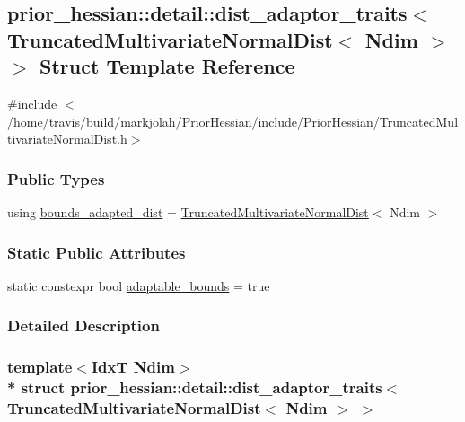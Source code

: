 \hypertarget{structprior__hessian_1_1detail_1_1dist__adaptor__traits_3_01TruncatedMultivariateNormalDist_3_01Ndim_01_4_01_4}{}\subsection{prior\+\_\+hessian\+:\+:detail\+:\+:dist\+\_\+adaptor\+\_\+traits$<$ Truncated\+Multivariate\+Normal\+Dist$<$ Ndim $>$ $>$ Struct Template Reference}
\label{structprior__hessian_1_1detail_1_1dist__adaptor__traits_3_01TruncatedMultivariateNormalDist_3_01Ndim_01_4_01_4}


{\ttfamily \#include $<$/home/travis/build/markjolah/\+Prior\+Hessian/include/\+Prior\+Hessian/\+Truncated\+Multivariate\+Normal\+Dist.\+h$>$}

\subsubsection*{Public Types}
\begin{DoxyCompactItemize}
\item 
using \hyperlink{structprior__hessian_1_1detail_1_1dist__adaptor__traits_3_01TruncatedMultivariateNormalDist_3_01Ndim_01_4_01_4_a43e134989627146928378cf267b991b4}{bounds\+\_\+adapted\+\_\+dist} = \hyperlink{namespaceprior__hessian_a99ef03c8a3e476931d451d6d944ffae5}{Truncated\+Multivariate\+Normal\+Dist}$<$ Ndim $>$
\end{DoxyCompactItemize}
\subsubsection*{Static Public Attributes}
\begin{DoxyCompactItemize}
\item 
static constexpr bool \hyperlink{structprior__hessian_1_1detail_1_1dist__adaptor__traits_3_01TruncatedMultivariateNormalDist_3_01Ndim_01_4_01_4_a5a7a73e24a925a4e7696ff7259f855c5}{adaptable\+\_\+bounds} = true
\end{DoxyCompactItemize}


\subsubsection{Detailed Description}
\subsubsection*{template$<$IdxT Ndim$>$\\*
struct prior\+\_\+hessian\+::detail\+::dist\+\_\+adaptor\+\_\+traits$<$ Truncated\+Multivariate\+Normal\+Dist$<$ Ndim $>$ $>$}



